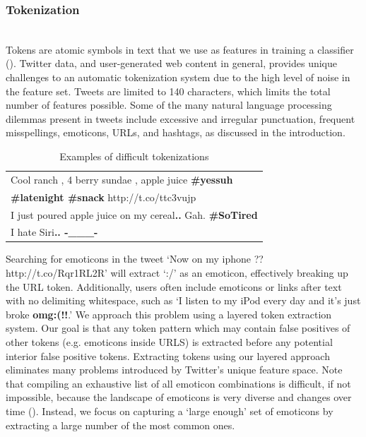 \documentclass[letterpaper]{article}
\begin{document}
\subsubsection{Tokenization}
~\\
Tokens are atomic symbols in text that we use as features in training a classifier (\citeauthor{Laboreiro:2010:TMM:1871840.1871853}). Twitter data, and user-generated web content in general, provides unique challenges to an automatic tokenization system due to the high level of noise in the feature set. Tweets are limited to 140 characters, which limits the total number of features possible. Some of the many natural language processing dilemmas present in tweets include excessive and irregular punctuation, frequent misspellings, emoticons, URLs, and hashtags, as discussed in the introduction.\\

\begin{table}[h]
\centering
\begin{tabular}{|l|}
	\hline
	Cool ranch , 4 berry sundae , apple juice \textbf{\#yessuh} \\ 
	\textbf{\#latenight \#snack} http://t.co/ttc3vujp \\ \hline
	I just poured apple juice on my cereal\textbf{..} Gah. \textbf{\#SoTired} \\ \hline
	I hate Siri\textbf{.. -\_\_\_-} \\
	\hline
\end{tabular}
\caption{Examples of difficult tokenizations}
\label{tab:tokenization_examples}
\end{table}

Searching for emoticons in the tweet `Now on my iphone ?? http://t.co/Rqr1RL2R' will extract `:/' as an emoticon, effectively breaking up the URL token. Additionally, users often include emoticons or links after text with no delimiting whitespace, such as `I listen to my iPod every day and it's just broke \textbf{omg:(!!}.' We approach this problem using a layered token extraction system. Our goal is that any token pattern which may contain false positives of other tokens (e.g. emoticons inside URLS) is extracted before any potential interior false positive tokens. Extracting tokens using our layered approach eliminates many problems introduced by Twitter's unique feature space. Note that compiling an exhaustive list of all emoticon combinations is difficult, if not impossible, because the landscape of emoticons is very diverse and changes over time (\citeauthor{Laboreiro:2010:TMM:1871840.1871853}). Instead, we focus on capturing a `large enough' set of emoticons by extracting a large number of the most common ones. \\
\end{document}
